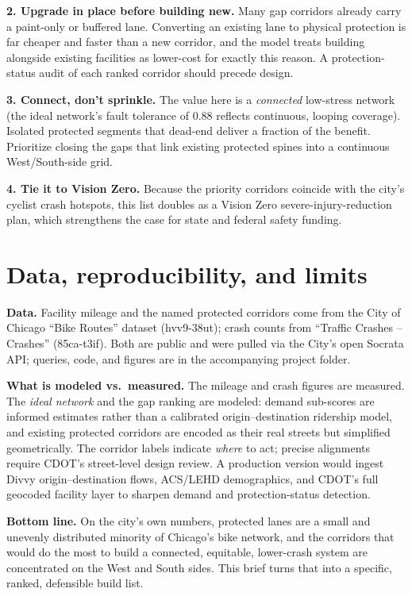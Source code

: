 \documentclass[11pt]{article}
\begin{document}
\textbf{2. Upgrade in place before building new.} Many gap corridors already carry a paint-only
or buffered lane. Converting an existing lane to physical protection is far cheaper and faster
than a new corridor, and the model treats building alongside existing facilities as lower-cost
for exactly this reason. A protection-status audit of each ranked corridor should precede design.

\textbf{3. Connect, don't sprinkle.} The value here is a \emph{connected} low-stress network
(the ideal network's fault tolerance of 0.88 reflects continuous, looping coverage). Isolated
protected segments that dead-end deliver a fraction of the benefit. Prioritize closing the gaps
that link existing protected spines into a continuous West/South-side grid.

\textbf{4. Tie it to Vision Zero.} Because the priority corridors coincide with the city's
cyclist crash hotspots, this list doubles as a Vision Zero severe-injury-reduction plan, which
strengthens the case for state and federal safety funding.

\section{Data, reproducibility, and limits}
\textbf{Data.} Facility mileage and the named protected corridors come from the City of Chicago
``Bike Routes'' dataset (hvv9-38ut); crash counts from ``Traffic Crashes -- Crashes''
(85ca-t3if). Both are public and were pulled via the City's open Socrata API; queries, code, and
figures are in the accompanying project folder.

\textbf{What is modeled vs.\ measured.} The mileage and crash figures are measured. The
\emph{ideal network} and the gap ranking are modeled: demand sub-scores are informed estimates
rather than a calibrated origin--destination ridership model, and existing protected corridors
are encoded as their real streets but simplified geometrically. The corridor labels indicate
\emph{where} to act; precise alignments require CDOT's street-level design review. A production
version would ingest Divvy origin--destination flows, ACS/LEHD demographics, and CDOT's full
geocoded facility layer to sharpen demand and protection-status detection.

\textbf{Bottom line.} On the city's own numbers, protected lanes are a small and unevenly
distributed minority of Chicago's bike network, and the corridors that would do the most to
build a connected, equitable, lower-crash system are concentrated on the West and South sides.
This brief turns that into a specific, ranked, defensible build list.
\end{document}
